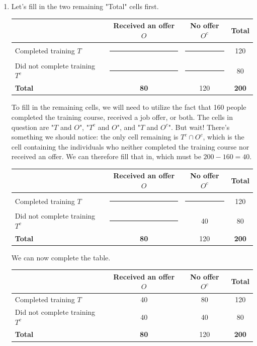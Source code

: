 \documentclass[11pt,letterpaper]{article}
\newcommand{\blank}{\rule{1.4em}{0.35pt}}
\begin{document}
\begin{enumerate}[label=\alph*.]

  
\item Let's fill in the two remaining "Total" cells first.

\begin{center}
\small
\begin{tabular}{|l|c|c|c|}
\hline
 & \textbf{Received an offer $O$} & \textbf{No offer $O^c$} & \textbf{Total} \\ \hline
Completed training $T$ & \blank & \blank & 120 \\ \hline
Did not complete training $T^c$ & \blank & \blank & 80 \\ \hline
\textbf{Total} & \textbf{80} & 120 & \textbf{200} \\ \hline
\end{tabular}
\end{center}

To fill in the remaining cells, we will need to utilize the fact that 160 people completed the training course, received a job offer, or both. The cells in question are "$T$ and $O$", "$T^c$ and $O$", and "$T$ and $O^c$". But wait! There's something we should notice: the only cell remaining is $T^c \cap O^c$, which is the cell containing the individuals who neither completed the training course nor received an offer. We can therefore fill that in, which must be $200 - 160 = 40$.

\begin{center}
\small
\begin{tabular}{|l|c|c|c|}
\hline
 & \textbf{Received an offer $O$} & \textbf{No offer $O^c$} & \textbf{Total} \\ \hline
Completed training $T$ & \blank & \blank & 120 \\ \hline
Did not complete training $T^c$ & \blank & 40 & 80 \\ \hline
\textbf{Total} & \textbf{80} & 120 & \textbf{200} \\ \hline
\end{tabular}
\end{center}

We can now complete the table.

\begin{center}
\small
\begin{tabular}{|l|c|c|c|}
\hline
 & \textbf{Received an offer $O$} & \textbf{No offer $O^c$} & \textbf{Total} \\ \hline
Completed training $T$ & 40 & 80 & 120 \\ \hline
Did not complete training $T^c$ & 40 & 40 & 80 \\ \hline
\textbf{Total} & \textbf{80} & 120 & \textbf{200} \\ \hline
\end{tabular}
\end{center}


\end{enumerate}
\end{document}
